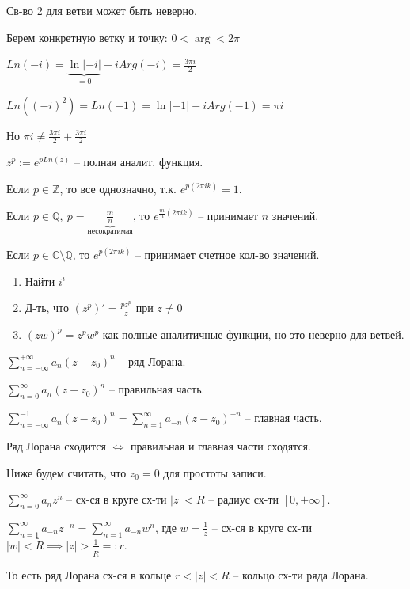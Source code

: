 \begin{remark}
    Св-во 2 для ветви может быть неверно.

    Берем конкретную ветку и точку:
    $0 < \arg < 2 \pi$

    $Ln(-i) = \underbrace{\ln{|-i|}}_{=0} + i Arg(-i) = \frac{3\pi i}{2}$

    $Ln((-i)^2) = Ln(-1) = \ln{|-1|} + i Arg(-1) = \pi i$

    Но $\pi i \not = \frac{3 \pi i}{2} + \frac{3 \pi i}{2}$
\end{remark}

\begin{remark}
    $z^p := e^{p Ln(z)}$ -- полная аналит. функция.

    Если $p \in \mathbb{Z}$, то все однозначно, т.к. $e^{p (2 \pi i k)} = 1$.

    Если $p \in \mathbb{Q}, \ p = \underbrace{\frac{m}{n}}_{\text{несократимая}}$, то $e^{\frac{m}{n} (2 \pi i k)}$ -- принимает $n$ значений.

    Если $p \in \mathbb{C} \setminus \mathbb{Q}$, то $e^{p (2 \pi i k)}$ -- принимает счетное кол-во значений.
\end{remark}



\begin{exerc}
    \begin{enumerate}
        \item Найти $i^i$
        \item Д-ть, что $(z^p)' = \frac{p z^p}{z}$ при $z \not = 0$
        \item $(z w)^p = z^p w^p$ как полные аналитичные функции, но это неверно для ветвей.
    \end{enumerate}
\end{exerc}



\begin{definition}
    $\sum_{n=-\infty}^{+\infty} a_n (z - z_0)^n$ -- ряд Лорана.

    $\sum_{n = 0}^{\infty} a_n (z - z_0)^n$ -- правильная часть.

    $\sum_{n = -\infty}^{-1} a_n (z - z_0)^n = \sum_{n = 1}^{\infty} a_{-n} (z - z_0)^{-n}$ -- главная часть.

    Ряд Лорана сходится $\Leftrightarrow$ правильная и главная части сходятся.

    Ниже будем считать, что $z_0 = 0$ для простоты записи.

    $\sum_{n=0}^{\infty} a_n z^n$ -- сх-ся в круге сх-ти $|z| < R$ -- радиус сх-ти $[0, +\infty]$.

    $\sum_{n = 1}^{\infty} a_{-n}z^{-n} = \sum_{n=1}^{\infty} a_{-n} w^{n}$, где $w = \frac{1}{z}$ -- сх-ся в круге сх-ти $|w| < \tilde{R} \implies |z| > \frac{1}{\tilde{R}} =: r$.

    То есть ряд Лорана сх-ся в кольце $r < |z| < R$ -- кольцо сх-ти ряда Лорана.
\end{definition}

